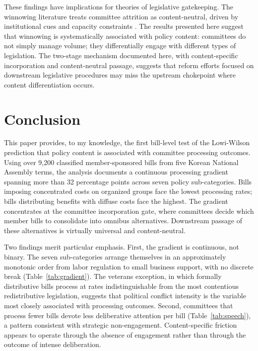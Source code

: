 \documentclass[11pt]{article}
\begin{document}
These findings have implications for theories of legislative gatekeeping. The winnowing literature treats committee attrition as content-neutral, driven by institutional cues and capacity constraints \citep{krutz2005}. The results presented here suggest that winnowing is systematically associated with policy content: committees do not simply manage volume; they differentially engage with different types of legislation. The two-stage mechanism documented here, with content-specific incorporation and content-neutral passage, suggests that reform efforts focused on downstream legislative procedures may miss the upstream chokepoint where content differentiation occurs.



\section{Conclusion}
\label{sec:conclusion}

This paper provides, to my knowledge, the first bill-level test of the Lowi-Wilson prediction that policy content is associated with committee processing outcomes. Using over 9,200 classified member-sponsored bills from five Korean National Assembly terms, the analysis documents a continuous processing gradient spanning more than 32 percentage points across seven policy sub-categories. Bills imposing concentrated costs on organized groups face the lowest processing rates; bills distributing benefits with diffuse costs face the highest. The gradient concentrates at the committee incorporation gate, where committees decide which member bills to consolidate into omnibus alternatives. Downstream passage of these alternatives is virtually universal and content-neutral.

Two findings merit particular emphasis. First, the gradient is continuous, not binary. The seven sub-categories arrange themselves in an approximately monotonic order from labor regulation to small business support, with no discrete break (Table~\ref{tab:gradient}). The veterans exception, in which formally distributive bills process at rates indistinguishable from the most contentious redistributive legislation, suggests that political conflict intensity is the variable most closely associated with processing outcomes. Second, committees that process fewer bills devote less deliberative attention per bill (Table~\ref{tab:speech}), a pattern consistent with strategic non-engagement. Content-specific friction appears to operate through the absence of engagement rather than through the outcome of intense deliberation.
\end{document}
